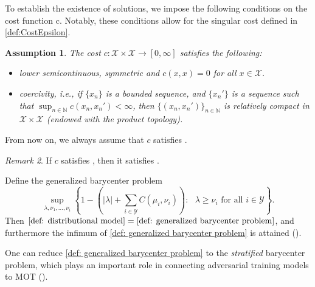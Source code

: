 \documentclass{amsart}
\theoremstyle{plain}
\numberwithin{equation}{section}\newtheorem{theorem}{Theorem}[section]
\newtheorem{assumption}[theorem]{Assumption}
\theoremstyle{remark}
\newtheorem{remark}[theorem]{Remark}
\newcommand{\X}{\mathcal{X}}
\begin{document}
To establish the existence of solutions, we impose the following conditions on the cost function c. Notably, these conditions allow for the singular cost defined in \eqref{def:CostEpsilon}.



\begin{assumption}\cite[Assumption 1]{jakwang_MOT}\label{assumption: cost function}
The cost $c: \X \times \X \rightarrow[0, \infty]$ satisfies the following:
\begin{itemize}
    \item lower semicontinuous, symmetric and $c(x,x)=0$ for all $x\in \X$.
    \item coercivity, i.e., if $\{ x_n \}$ is a bounded sequence, and $\{ x_n' \}$ is a sequence such that $\sup_{n \in \mathbb{N}} c(x_n, x_n')< \infty$,
    then $\{(x_n, x_n') \}_{n \in \mathbb{N}}$ is relatively compact in $\X \times \X$ (endowed with the product topology).
\end{itemize}
\end{assumption}
From now on, we always assume that $c$ satisfies .



\begin{remark}
If $c$ satisfies , then it satisfies . 
\end{remark}





Define the generalized barycenter problem
\begin{equation}\label{def: generalized barycenter problem}
    \sup_{\lambda, \nu_1, \ldots, \nu_i} \left\{ 1 - \left( |\lambda| + \sum_{i \in \mathcal{Y}}C(\mu_i, \nu_i) \right)  : \text{ $\lambda \geq \nu_i$ for all $i \in \mathcal{Y}$} \right\}.
\end{equation}
Then $\eqref{def: distributional model} = \eqref{def: generalized barycenter problem}$, and furthermore the infimum of \eqref{def: generalized barycenter problem} is attained (\cite[Proposition 7 and Corollary 32]{jakwang_MOT}).






One can reduce \eqref{def: generalized barycenter problem} to the \emph{stratified} barycenter problem, which plays an important role in connecting adversarial training models to MOT (\cite[Proposition 11]{jakwang_MOT}).
\end{document}
